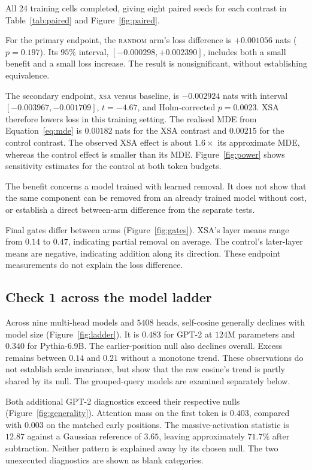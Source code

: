 \documentclass{article} %
\begin{document}
All 24 training cells completed, giving eight paired seeds for each contrast
in Table~\ref{tab:paired} and Figure~\ref{fig:paired}.

For the primary endpoint, the \textsc{random} arm's loss difference is
$+0.001056$ nats ($p = 0.197$). Its $95\%$ interval,
$[-0.000298, +0.002390]$, includes both a small benefit and a small loss
increase. The result is nonsignificant, without establishing equivalence.

The secondary endpoint, \textsc{xsa} versus baseline, is $-0.002924$ nats with
interval $[-0.003967, -0.001709]$, $t = -4.67$, and Holm-corrected $p =
0.0023$. XSA therefore lowers loss in this training setting. The realised MDE from
Equation~\ref{eq:mde} is $0.00182$ nats for the XSA contrast and $0.00215$ for
the control contrast. The observed XSA effect is about $1.6\times$ its
approximate MDE, whereas the control effect is smaller than its MDE.
Figure~\ref{fig:power} shows sensitivity estimates for the control at both
token budgets.

The benefit concerns a model trained with learned removal. It does not show
that the same component can be removed from an already trained model without
cost, or establish a direct between-arm difference from the separate tests.

Final gates differ between arms (Figure~\ref{fig:gates}). XSA's layer means
range from $0.14$ to $0.47$, indicating partial removal on average.
The control's later-layer means are negative, indicating addition along
its direction. These endpoint measurements do not explain the loss difference.

\subsection{Check 1 across the model ladder}
\label{sec:ladder}

Across nine multi-head models and $5408$ heads, self-cosine generally
declines with model size (Figure~\ref{fig:ladder}). It is $0.483$ for
GPT-2 at $124$M parameters and $0.340$ for Pythia-6.9B. The earlier-position
null also declines overall. Excess remains between $0.14$ and $0.21$
without a monotone trend. These observations do not establish scale
invariance, but show that the raw cosine's trend is partly shared by its
null. The grouped-query models are examined separately below.

Both additional GPT-2 diagnostics exceed their respective nulls
(Figure~\ref{fig:generality}). Attention mass on the first token is
$0.403$, compared with $0.003$ on the matched early positions. The
massive-activation statistic is $12.87$ against a Gaussian reference of
$3.65$, leaving approximately $71.7\%$ after subtraction. Neither pattern
is explained away by its chosen null. The two unexecuted diagnostics are
shown as blank categories.
\end{document}
